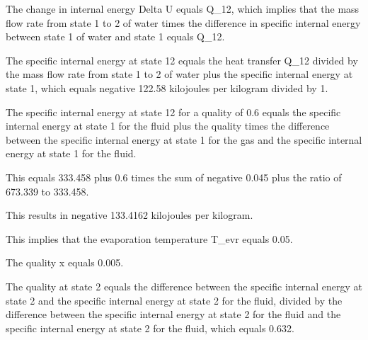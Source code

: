 The change in internal energy Delta U equals Q_12, which implies that the mass flow rate from state 1 to 2 of water times the difference in specific internal energy between state 1 of water and state 1 equals Q_12.

The specific internal energy at state 12 equals the heat transfer Q_12 divided by the mass flow rate from state 1 to 2 of water plus the specific internal energy at state 1, which equals negative 122.58 kilojoules per kilogram divided by 1.

The specific internal energy at state 12 for a quality of 0.6 equals the specific internal energy at state 1 for the fluid plus the quality times the difference between the specific internal energy at state 1 for the gas and the specific internal energy at state 1 for the fluid.

This equals 333.458 plus 0.6 times the sum of negative 0.045 plus the ratio of 673.339 to 333.458.

This results in negative 133.4162 kilojoules per kilogram.

This implies that the evaporation temperature T_evr equals 0.05.

The quality x equals 0.005.

The quality at state 2 equals the difference between the specific internal energy at state 2 and the specific internal energy at state 2 for the fluid, divided by the difference between the specific internal energy at state 2 for the fluid and the specific internal energy at state 2 for the fluid, which equals 0.632.